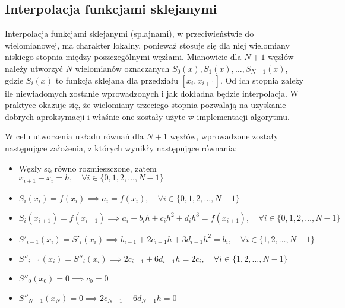 \documentclass[a4paper,12pt]{article}
\begin{document}
  	\subsection{Interpolacja funkcjami sklejanymi}
  	Interpolacja funkcjami sklejanymi (splajnami), w przeciwieństwie do wielomianowej, ma charakter lokalny, ponieważ stosuje się dla niej wielomiany niskiego stopnia między poszczególnymi węzłami. Mianowicie dla $N+1$ węzłów należy utworzyć $N$ wielomianów oznaczanych $S_0(x), S_1(x), \dots, S_{N-1}(x)$, gdzie $S_i(x)$ to funkcja sklejana dla przedziału $[x_i, x_{i+1}]$. Od ich stopnia zależy ile niewiadomych zostanie wprowadzonych i jak dokładna będzie interpolacja. W praktyce okazuje się, że wielomiany trzeciego stopnia pozwalają na uzyskanie dobrych aproksymacji i właśnie one zostały użyte w implementacji algorytmu. 
  	\par W celu utworzenia układu równań dla $N+1$ węzłów, wprowadzone zostały następujące założenia, z których wynikły następujące równania:
  	\begin{itemize}
  		\item Węzły są równo rozmieszczone, zatem $x_{i+1}-x_i=h, \quad \forall i \in \{0, 1, 2, \dots, N-1\}$
  		\item $S_i(x_i)=f(x_i) \implies a_i = f(x_i), \quad \forall i \in \{0, 1, 2, \dots, N-1\}$
  		\item $S_i(x_{i+1})=f(x_{i+1}) \implies a_i + b_ih + c_ih^2 + d_ih^3 = f(x_{i+1}), \quad \forall i \in \{0, 1, 2, \dots, N-1\}$
  		\item $S'_{i-1}(x_i)=S'_i(x_i) \implies b_{i-1} + 2c_{i-1}h + 3d_{i-1}h^2 = b_i, \quad \forall i \in \{1, 2, \dots, N-1\}$
  		\item $S''_{i-1}(x_i)=S''_i(x_i) \implies 2c_{i-1} + 6d_{i-1}h = 2c_i, \quad \forall i \in \{1, 2, \dots, N-1\}$
  		\item $S''_0(x_0)=0 \implies c_0=0$
  		\item $S''_{N-1}(x_N)=0 \implies 2c_{N-1} + 6d_{N-1}h = 0$
  	\end{itemize}
  	
\end{document}
